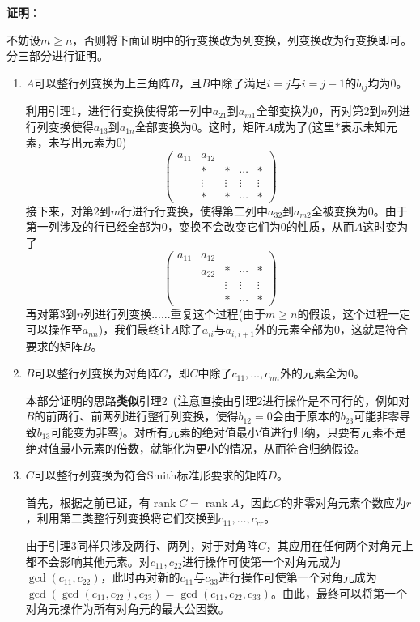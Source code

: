 \documentclass[a4paper,UTF8,fontset=windows,AutoFakeBold]{ctexart}
\DeclareMathOperator{\rank}{rank}
\newcommand{\proo}[1]{{\vspace{5pt}\kaishu\noindent\textbf{证明}：\vspace{-3pt}
\begin{compactitem}
    \item[] #1
\end{compactitem}
}}
\begin{document}
\proo{
    不妨设$m\ge n$，否则将下面证明中的行变换改为列变换，列变换改为行变换即可。分三部分进行证明。
    \begin{enumerate}
        \item $A$可以整行列变换为上三角阵$B$，且$B$中除了满足$i=j$与$i=j-1$的$b_{ij}$均为0。
        
        利用引理1，进行行变换使得第一列中$a_{21}$到$a_{m1}$全部变换为0，再对第2到$n$列进行列变换使得$a_{13}$到$a_{1n}$全部变换为0。这时，矩阵$A$成为了(这里$*$表示未知元素，未写出元素为0)
        $$\begin{pmatrix}a_{11}&a_{12}&\\ &*&*&\cdots&*\\ &\vdots&\vdots&\vdots&\vdots\\ &*&*&\cdots&*\end{pmatrix}$$
        接下来，对第2到$m$行进行行变换，使得第二列中$a_{32}$到$a_{m2}$全被变换为0。由于第一列涉及的行已经全部为0，变换不会改变它们为0的性质，从而$A$这时变为了
        $$\begin{pmatrix}a_{11}&a_{12}\\ &a_{22}&*&\cdots&*\\ &&\vdots&\vdots&\vdots\\ &&*&\cdots&*\end{pmatrix}$$
        再对第3到$n$列进行列变换......重复这个过程(由于$m\ge n$的假设，这个过程一定可以操作至$a_{nn}$)，我们最终让$A$除了$a_{ii}$与$a_{i,i+1}$外的元素全部为0，这就是符合要求的矩阵$B$。

        \item $B$可以整行列变换为对角阵$C$，即$C$中除了$c_{11},\dots,c_{nn}$外的元素全为0。
        
        本部分证明的思路\textbf{类似}引理2\ (注意直接由引理2进行操作是不可行的，例如对$B$的前两行、前两列进行整行列变换，使得$b_{12}=0$会由于原本的$b_{23}$可能非零导致$b_{13}$可能变为非零)。对所有元素的绝对值最小值进行归纳，只要有元素不是绝对值最小元素的倍数，就能化为更小的情况，从而符合归纳假设。

        \item $C$可以整行列变换为符合Smith标准形要求的矩阵$D$。
        
        首先，根据之前已证，有$\rank C=\rank A$，因此$C$的非零对角元素个数应为$r$，利用第二类整行列变换将它们交换到$c_{11},\dots,c_{rr}$。

        由于引理3同样只涉及两行、两列，对于对角阵$C$，其应用在任何两个对角元上都不会影响其他元素。对$c_{11},c_{22}$进行操作可使第一个对角元成为$\gcd(c_{11},c_{22})$，此时再对新的$c_{11}$与$c_{33}$进行操作可使第一个对角元成为$\gcd(\gcd(c_{11},c_{22}),c_{33})=\gcd(c_{11},c_{22},c_{33})$。由此，最终可以将第一个对角元操作为所有对角元的最大公因数。
        

\end{enumerate}}
\end{document}
